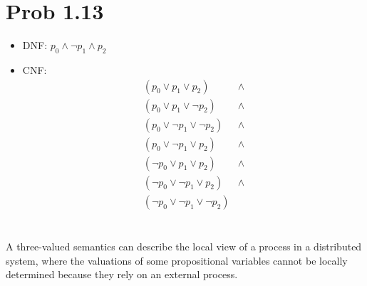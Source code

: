 \documentclass[a4paper]{article}
\begin{document}
\section{Prob 1.13}
\begin{itemize}
\item[] DNF: $p_{0} \wedge \lnot p_{1} \wedge p_{2}$
\item[] CNF:
  \begin{align*}
    (p_{0} \vee p_{1} \vee p_{2}) &\wedge\\
    (p_{0} \vee p_{1} \vee \lnot p_{2}) &\wedge\\
    (p_{0} \vee \lnot p_{1} \vee \lnot p_{2}) &\wedge\\
    (p_{0} \vee \lnot p_{1} \vee p_{2}) &\wedge\\
    (\lnot p_{0} \vee p_{1} \vee p_{2}) &\wedge\\
    (\lnot p_{0} \vee \lnot p_{1} \vee p_{2}) &\wedge\\
    (\lnot p_{0} \vee \lnot p_{1} \vee \lnot p_{2})
  \end{align*}
\end{itemize}

\section{}
A three-valued semantics can describe the local view of a process in a distributed system, where the valuations of some propositional variables cannot be locally determined because they rely on an external process.
\end{document}
